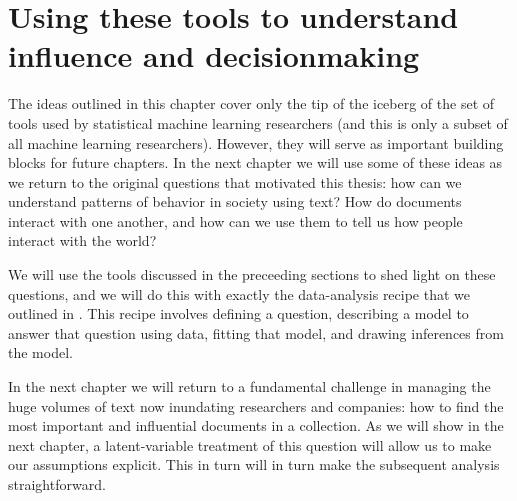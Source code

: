 \section{Using these tools to understand influence and decisionmaking}

The ideas outlined in this chapter cover only the tip of the iceberg
of the set of tools used by statistical machine learning researchers
(and this is only a subset of all machine learning researchers).
However, they will serve as important building blocks for future
chapters.  In the next chapter we will use some of these ideas as we
return to the original questions that motivated this thesis: how can
we understand patterns of behavior in society using text?  How do
documents interact with one another, and how can we use them to tell
us how people interact with the world?

We will use the tools discussed in the preceeding sections to shed
light on these questions, and we will do this with exactly the
data-analysis recipe that we outlined in
.  This recipe involves defining a question,
describing a model to answer that question using data, fitting that
model, and drawing inferences from the model.
 
In the next chapter we will return to a fundamental challenge in
managing the huge volumes of text now inundating researchers and
companies: how to find the most important and influential documents in
a collection.  As we will show in the next chapter, a latent-variable
treatment of this question will allow us to make our assumptions
explicit.  This in turn will in turn make the subsequent analysis
straightforward.

